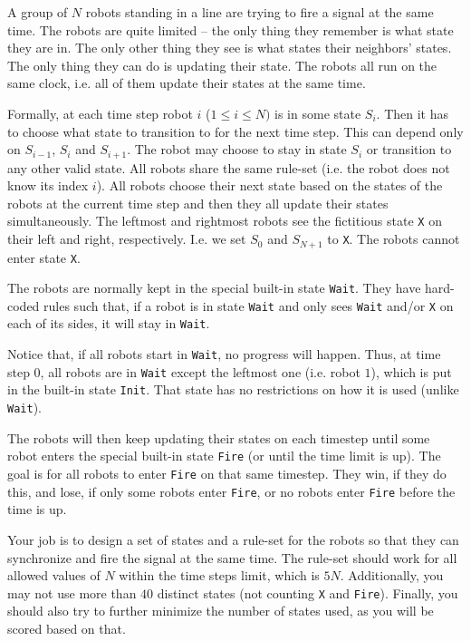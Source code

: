 \documentclass[12pt]{article}
\begin{document}
\renewcommand{\header}{
	TRAINING COMPETITION FOR THE\\
	BULGARIAN EXTENDED NATIONAL TEAM\\
	Bankya, 20 June 2025\\
	Group A
}

A group of $N$ robots standing in a line are trying to fire a signal at the same time. The robots are quite limited -- the only thing they remember is what state they are in. The only other thing they see is what states their neighbors' states. The only thing they can do is updating their state. The robots all run on the same clock, i.e. all of them update their states at the same time.

Formally, at each time step robot $i$ ($1 \leq i \leq N)$ is in some state $S_i$. Then it has to choose what state to transition to for the next time step. This can depend only on $S_{i-1}$, $S_i$ and $S_{i+1}$. The robot may choose to stay in state $S_i$ or transition to any other valid state. All robots share the same rule-set (i.e. the robot does not know its index $i$). All robots choose their next state based on the states of the robots at the current time step and then they all update their states simultaneously. The leftmost and rightmost robots see the fictitious state \verb|X| on their left and right, respectively. I.e. we set $S_0$ and $S_{N+1}$ to \verb|X|. The robots cannot enter state \verb|X|.

The robots are normally kept in the special built-in state \verb|Wait|. They have hard-coded rules such that, if a robot is in state \verb|Wait| and only sees \verb|Wait| and/or \verb|X| on each of its sides, it will stay in \verb|Wait|.

Notice that, if all robots start in \verb|Wait|, no progress will happen. Thus, at time step 0, all robots are in \verb|Wait| except the leftmost one (i.e. robot $1$), which is put in the built-in state \verb|Init|. That state has no restrictions on how it is used (unlike \verb|Wait|).

The robots will then keep updating their states on each timestep until some robot enters
the special built-in state \verb|Fire| (or until the time limit is up). The goal is for all
robots to enter \verb|Fire| on that same timestep. They win, if they do this, and lose,
if only some robots enter \verb|Fire|, or no robots enter \verb|Fire| before the time is up.

Your job is to design a set of states and a rule-set for the robots so that they can synchronize and fire the signal at the same time. The rule-set should work for all allowed values of $N$ within the time steps limit, which is $5N$. Additionally, you may not use more than $40$ distinct states (not counting \verb|X| and \verb|Fire|). Finally, you should also try to further minimize the number of states used, as you will be scored based on that.
\end{document}
